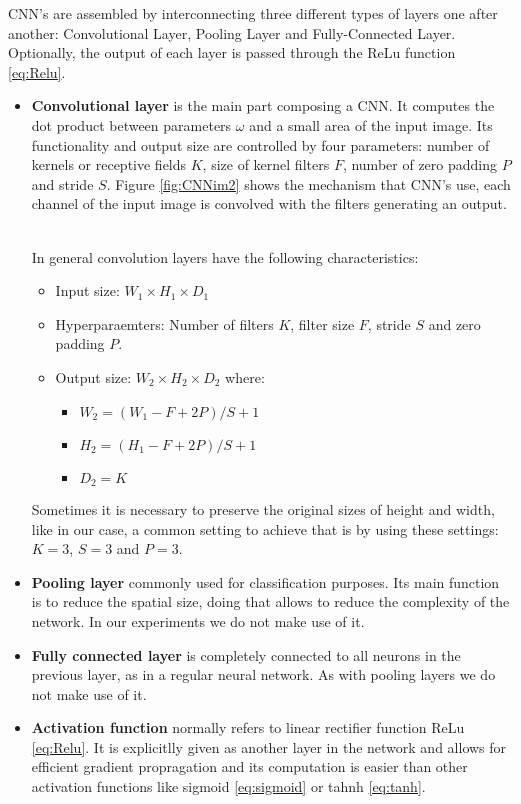CNN's are assembled by interconnecting three different types of layers one after another: Convolutional Layer, Pooling Layer and Fully-Connected Layer. Optionally, the output of each layer is passed through the ReLu function \ref{eq:Relu}. 
\begin{itemize}
\item \textbf{Convolutional layer} is the main part composing a CNN. It computes the dot product between parameters $\omega$ and a small area of the input image. Its  functionality and output size are controlled by four parameters: number of kernels or receptive fields $K$, size of kernel filters $F$, number of zero padding $P$ and stride $S$. Figure \ref{fig:CNNim2} shows the mechanism that  CNN's use, each channel of the input image is convolved with the filters generating an output.  \

In general convolution layers have the following characteristics:
\begin{itemize}
\item Input size: \boldmath$W_1 \times H_1 \times D_1$
\item Hyperparaemters: Number of filters \boldmath$K$, filter size \boldmath$F$, stride \boldmath$S$ and zero padding \boldmath$P$.  
\item Output size: \boldmath$W_2 \times H_2 \times D_2$ where:
\begin{itemize} \label{sec:outCNN}
\item \boldmath$W_2 = ( W_1 - F + 2P) / S + 1 $
\item \boldmath$H_2 = ( H_1 - F + 2P) / S + 1 $
\item \boldmath$D_2 = K $
\end{itemize}
\end{itemize}

Sometimes it is necessary to preserve the original sizes of height and width, like in our case, a common setting to achieve that is by using these settings: $K =3$, $S =3$ and $P =3$.   

\item \textbf{Pooling layer} commonly used for classification purposes. Its main function is to reduce the spatial size, doing that allows to reduce the complexity of the network. In our experiments we do not make use of it. \

\item \textbf{Fully connected layer} is completely connected to all neurons in the previous layer, as in a regular neural network. As with pooling layers we do not make use of it. 

\item \textbf{Activation function} normally refers to linear rectifier function ReLu \ref{eq:Relu}. It is explicitlly given as another layer in the network and allows for efficient gradient propragation and its computation is easier than other activation functions like sigmoid \ref{eq:sigmoid} or tahnh \ref{eq:tanh}.

\end{itemize}
